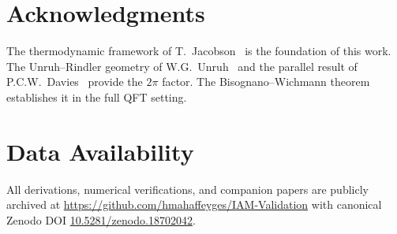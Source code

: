 \documentclass[12pt,a4paper]{article}
\begin{document}
\section*{Acknowledgments}

The thermodynamic framework of T.\ Jacobson~\citep{Jacobson1995} is
the foundation of this work. The Unruh--Rindler geometry of W.G.\ Unruh~\citep{Unruh1976}
and the parallel result of P.C.W.\ Davies~\citep{Davies1975} provide
the $2\pi$ factor. The Bisognano--Wichmann theorem~\citep{Bisognano1976}
establishes it in the full QFT setting.

\section*{Data Availability}

All derivations, numerical verifications, and companion papers are
publicly archived at \url{https://github.com/hmahaffeyges/IAM-Validation}
with canonical Zenodo DOI
\href{https://doi.org/10.5281/zenodo.18702042}{10.5281/zenodo.18702042}.

\end{document}
